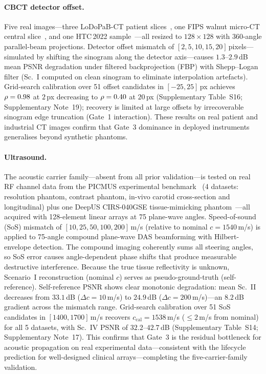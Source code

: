 \paragraph{CBCT detector offset.}
Five real images---three LoDoPaB-CT patient slices~\cite{leuschner2021lodopab}, one FIPS walnut micro-CT central slice~\cite{hamalainen2015fips}, and one HTC\,2022 sample~\cite{meaney2022htc}---all resized to $128 \times 128$ with 360-angle parallel-beam projections. Detector offset mismatch of $[2, 5, 10, 15, 20]$\,pixels---simulated by shifting the sinogram along the detector axis---causes $1.3$--$2.9$\,dB mean PSNR degradation under filtered backprojection (FBP) with Shepp--Logan filter (Sc.~I computed on clean sinogram to eliminate interpolation artefacts). Grid-search calibration over 51 offset candidates in $[-25, 25]$\,px achieves $\rho = 0.98$ at $2$\,px decreasing to $\rho = 0.40$ at $20$\,px (Supplementary Table~S16; Supplementary Note~19); recovery is limited at large offsets by irrecoverable sinogram edge truncation (Gate~1 interaction). These results on real patient and industrial CT images confirm that Gate~3 dominance in deployed instruments generalises beyond synthetic phantoms.

\paragraph{Ultrasound.}
The acoustic carrier family---absent from all prior validation---is tested on real RF channel data from the PICMUS experimental benchmark~\cite{liebgott2016picmus} (4 datasets: resolution phantom, contrast phantom, in-vivo carotid cross-section and longitudinal) plus one DeepUS CIRS-040GSE tissue-mimicking phantom~\cite{khan2020deepus}---all acquired with 128-element linear arrays at 75 plane-wave angles. Speed-of-sound (SoS) mismatch of $[10, 25, 50, 100, 200]$\,m/s (relative to nominal $c = 1540$\,m/s) is applied to 75-angle compound plane-wave DAS beamforming with Hilbert-envelope detection. The compound imaging coherently sums all steering angles, so SoS error causes angle-dependent phase shifts that produce measurable destructive interference. Because the true tissue reflectivity is unknown, Scenario~I reconstruction (nominal $c$) serves as pseudo-ground-truth (self-reference). Self-reference PSNR shows clear monotonic degradation: mean Sc.~II decreases from $33.1$\,dB ($\Delta c{=}10$\,m/s) to $24.9$\,dB ($\Delta c{=}200$\,m/s)---an $8.2$\,dB gradient across the mismatch range. Grid-search calibration over 51 SoS candidates in $[1400, 1700]$\,m/s recovers $c_{\mathrm{cal}} = 1538$\,m/s ($\leq 2$\,m/s from nominal) for all 5 datasets, with Sc.~IV PSNR of $32.2$--$42.7$\,dB (Supplementary Table~S14; Supplementary Note~17). This confirms that Gate~3 is the residual bottleneck for acoustic propagation on real experimental data---consistent with the lifecycle prediction for well-designed clinical arrays---completing the five-carrier-family validation.

